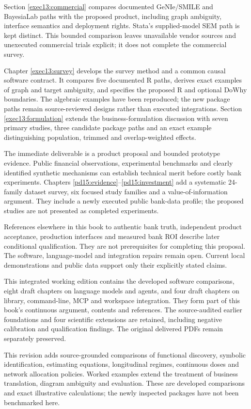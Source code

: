 \documentclass[11pt,a4paper,openany]{book}
\begin{document}
Section \ref{exec13:commercial} compares documented GeNIe/SMILE and BayesiaLab
paths with the proposed product, including graph ambiguity, interface semantics
and deployment rights. Stata's supplied-model SEM path is kept distinct.
This bounded comparison leaves unavailable vendor sources and unexecuted
commercial trials explicit; it does not complete the commercial survey.


Chapter \ref{exec13:survey} develops the survey method and a common causal
software contract. It compares five documented R paths, derives exact examples
of graph and target ambiguity, and specifies the proposed R and optional DoWhy
boundaries. The algebraic examples have been reproduced; the new package
paths remain source-reviewed designs rather than executed integrations.
Section \ref{exec13:formulation} extends the business-formulation discussion
with seven primary studies, three candidate package paths and an exact
example distinguishing population, trimmed and overlap-weighted effects.


The immediate deliverable is a product proposal and bounded prototype evidence.
Public financial observations, experimental benchmarks and clearly identified
synthetic mechanisms can establish technical merit before costly bank experiments.
Chapters \ref{pd15:evidence}--\ref{pd15:investment} add a systematic 24-family
dataset survey, six focused study families and a value-of-information argument.
They include a newly executed public bank-data profile; the proposed studies
are not presented as completed experiments.

References elsewhere in this book to authentic bank truth, independent product
acceptance, production interfaces and measured bank ROI describe later conditional
qualification. They are not prerequisites for completing this proposal.
The software, language-model and integration repairs remain open. Current local
demonstrations and public data support only their explicitly stated claims.


This integrated working edition contains the developed software comparisons,
eight draft chapters on language models and agents, and four draft chapters on
library, command-line, MCP and workspace integration. They form part of this
book's continuous argument, contents and references. The source-audited earlier
foundations and four scientific extensions are retained, including negative
calibration and qualification findings. The original delivered PDFs remain
separately preserved.

This revision adds source-grounded comparisons of functional discovery, symbolic identification, estimating equations, longitudinal regimes, continuous doses and network allocation policies. Worked examples extend the treatment of business translation, diagram ambiguity and evaluation. These are developed comparisons and exact illustrative calculations; the newly inspected packages have not been benchmarked here.
\end{document}
